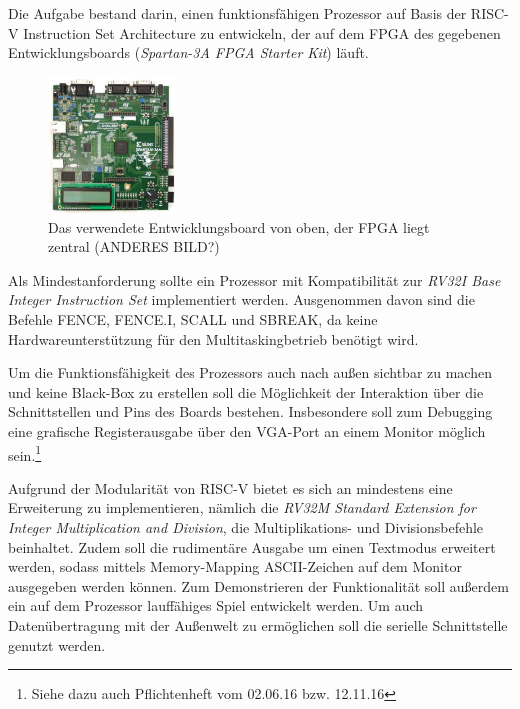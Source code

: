 

Die Aufgabe bestand darin, einen funktionsf\"ahigen Prozessor auf Basis der RISC-V Instruction Set Architecture zu entwickeln, der auf dem FPGA des gegebenen Entwicklungsboards (\textit{Spartan-3A FPGA Starter Kit}) l\"auft.
\begin{figure}[H]
	\centering
		\includegraphics[width=0.3\textwidth]{Board.png}
	\caption{Das verwendete Entwicklungsboard von oben, der FPGA liegt zentral  (ANDERES BILD?)}
	\label{fig:board}
\end{figure}


Als Mindestanforderung sollte ein Prozessor mit Kompatibilit\"at zur \textit{RV32I Base Integer Instruction Set} implementiert werden. Ausgenommen davon sind die Befehle FENCE, FENCE.I, SCALL und SBREAK, da keine Hardwareunterst\"utzung f\"ur den Multitaskingbetrieb ben\"otigt wird.

Um die Funktionsf\"ahigkeit des Prozessors auch nach au{\ss}en sichtbar zu machen und keine Black-Box zu erstellen soll die M\"oglichkeit der Interaktion \"uber die Schnittstellen und Pins des Boards bestehen. Insbesondere soll zum Debugging eine grafische Registerausgabe \"uber den VGA-Port an einem Monitor m\"oglich sein.\footnote{Siehe dazu auch Pflichtenheft vom 02.06.16 bzw. 12.11.16}


Aufgrund der Modularit\"at von RISC-V bietet es sich an mindestens eine Erweiterung zu implementieren, n\"amlich die \textit{RV32M Standard Extension for Integer Multiplication and Division}, die Multiplikations- und Divisionsbefehle beinhaltet. Zudem soll die rudiment\"are Ausgabe um einen Textmodus erweitert werden, sodass mittels Memory-Mapping ASCII-Zeichen auf dem Monitor ausgegeben werden k\"onnen. Zum Demonstrieren der Funktionalit\"at soll au{\ss}erdem ein auf dem Prozessor lauff\"ahiges Spiel entwickelt werden. Um auch Daten\"ubertragung mit der Au{\ss}enwelt zu erm\"oglichen soll die serielle Schnittstelle genutzt werden.

